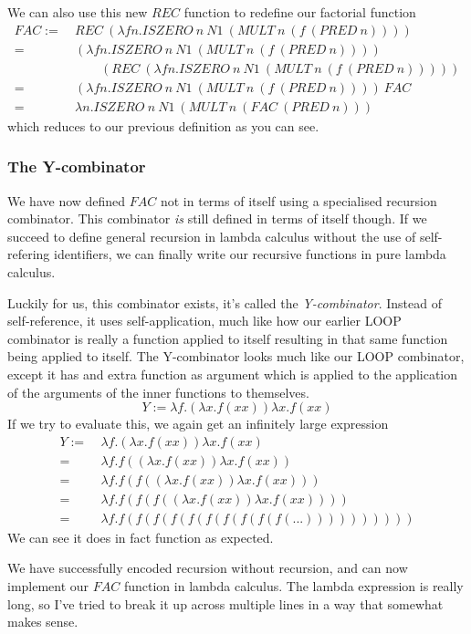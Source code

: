 \documentclass[11pt]{article}
\begin{document}
We can also use this new \(REC\) function to redefine our factorial function
\begin{align*}
	FAC:=\ &REC\ (\lambda fn.ISZERO\ n\ N1\ (MULT\ n\ (f\ (PRED\ n))))\\
	=\ &(\lambda fn.ISZERO\ n\ N1\ (MULT\ n\ (f\ (PRED\ n))))\\
	&\qquad(REC\ (\lambda fn.ISZERO\ n\ N1\ (MULT\ n\ (f\ (PRED\ n)))))\\
	=\ &(\lambda fn.ISZERO\ n\ N1\ (MULT\ n\ (f\ (PRED\ n))))\ FAC\\
	=\ &\lambda n.ISZERO\ n\ N1\ (MULT\ n\ (FAC\ (PRED\ n)))
\end{align*}
which reduces to our previous definition as you can see.

\subsubsection{The Y-combinator}

We have now defined \(FAC\) not in terms of itself using a specialised
recursion combinator. This combinator \emph{is} still defined in terms of
itself though. If we succeed to define general recursion in lambda calculus
without the use of self-refering identifiers, we can finally write our
recursive functions in pure lambda calculus.

Luckily for us, this combinator exists, it's called the \emph{Y-combinator}.
Instead of self-reference, it uses self-application, much like how our earlier
LOOP combinator is really a function applied to itself resulting in that same
function being applied to itself. The Y-combinator looks much like our LOOP
combinator, except it has and extra function as argument which is applied to
the application of the arguments of the inner functions to themselves.
\[Y:=\lambda f.(\lambda x.f(xx))\lambda x.f(xx)\]
If we try to evaluate this, we again get an infinitely large expression
\begin{align*}
	Y:=\ &\lambda f.(\lambda x.f(xx))\lambda x.f(xx)\\
	=\ &\lambda f.f((\lambda x.f(xx))\lambda x.f(xx))\\
	=\ &\lambda f.f(f((\lambda x.f(xx))\lambda x.f(xx)))\\
	=\ &\lambda f.f(f(f((\lambda x.f(xx))\lambda x.f(xx))))\\
	=\ &\lambda f.f(f(f(f(f(f(f(f(f(f(...))))))))))
\end{align*}
We can see it does in fact function as expected.

We have successfully encoded recursion without recursion, and can now implement
our \(FAC\) function in lambda calculus. The lambda expression is really long,
so I've tried to break it up across multiple lines in a way that somewhat makes
sense.
\end{document}
